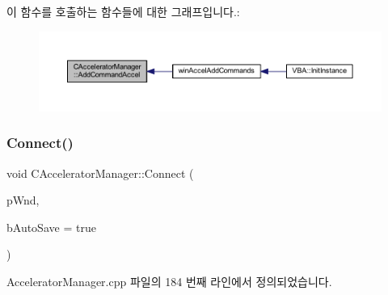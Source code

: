 이 함수를 호출하는 함수들에 대한 그래프입니다.\+:
\nopagebreak
\begin{figure}[H]
\begin{center}
\leavevmode
\includegraphics[width=350pt]{class_c_accelerator_manager_a05227e733c2c5d4a4d8074bf28a4f333_icgraph}
\end{center}
\end{figure}
\mbox{\label{class_c_accelerator_manager_a2d01e04665e3d03f3c1410bd69b0a82c}} 
\subsubsection{\texorpdfstring{Connect()}{Connect()}}
{\footnotesize\ttfamily void C\+Accelerator\+Manager\+::\+Connect (\begin{DoxyParamCaption}\item[{C\+Wnd $\ast$}]{p\+Wnd,  }\item[{bool}]{b\+Auto\+Save = {\ttfamily true} }\end{DoxyParamCaption})}



Accelerator\+Manager.\+cpp 파일의 184 번째 라인에서 정의되었습니다.


